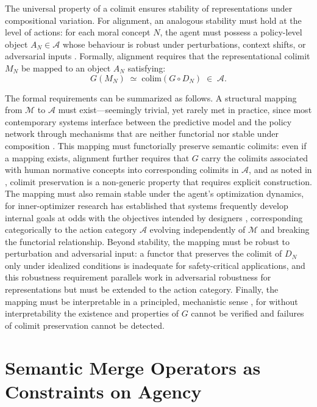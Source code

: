 \documentclass[12pt]{article}
\theoremstyle{definition}
\begin{document}
The universal property of a colimit ensures stability of representations under
compositional variation. For alignment, an analogous stability must hold at the
level of actions: for each moral concept $N$, the agent must possess a
policy-level object $A_N \in \mathcal{A}$ whose behaviour is robust under
perturbations, context shifts, or adversarial inputs \citep{gabriel2020}.
Formally, alignment requires that the representational colimit $M_N$ be mapped
to an object $A_N$ satisfying:
\begin{equation}
  G(M_N) \;\simeq\; \mathrm{colim}(G \circ D_N) \;\in\; \mathcal{A}.
\end{equation}

The formal requirements can be summarized as follows. A structural mapping
from $\mathcal{M}$ to $\mathcal{A}$ must exist---seemingly trivial, yet rarely
met in practice, since most contemporary systems interface between the predictive
model and the policy network through mechanisms that are neither functorial nor
stable under composition \citep{krakovna2020}. This mapping must functorially
preserve semantic colimits: even if a mapping exists, alignment further requires
that $G$ carry the colimits associated with human normative concepts into
corresponding colimits in $\mathcal{A}$, and as noted in
\citep{maclane1998,riehl2017}, colimit preservation is a non-generic property
that requires explicit construction. The mapping must also remain stable under
the agent's optimization dynamics, for inner-optimizer research has established
that systems frequently develop internal goals at odds with the objectives
intended by designers \citep{hubinger2019risks}, corresponding categorically to
the action category $\mathcal{A}$ evolving independently of $\mathcal{M}$ and
breaking the functorial relationship. Beyond stability, the mapping must be
robust to perturbation and adversarial input: a functor that preserves the
colimit of $D_N$ only under idealized conditions is inadequate for
safety-critical applications, and this robustness requirement parallels work in
adversarial robustness for representations \citep{ilyas2019} but must be
extended to the action category. Finally, the mapping must be interpretable in a
principled, mechanistic sense \citep{olah2020,elhage2022}, for without
interpretability the existence and properties of $G$ cannot be verified and
failures of colimit preservation cannot be detected.

\section{Semantic Merge Operators as Constraints on Agency}
\end{document}
